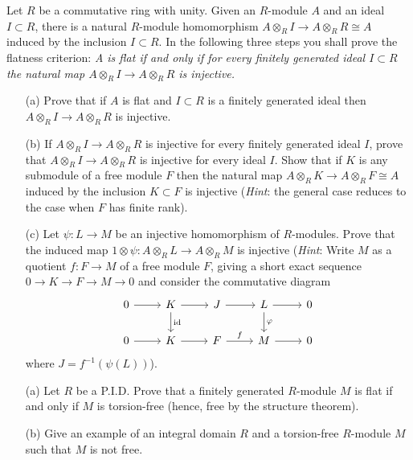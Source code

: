 \begin{prob}[F2013-Q3]
    Let \(R\) be a commutative ring with unity. Given an \(R\)-module \(A\) and an ideal \(I \subset R\), there is a natural \(R\)-module homomorphism \(A \otimes_R I \to A \otimes_R R \cong A\) induced by the inclusion \(I \subset R\). In the following three steps you shall prove the flatness criterion: \textit{A is flat if and only if for every finitely generated ideal \(I \subset R\) the natural map \(A \otimes_R I \to A \otimes_R R\) is injective.}
    \begin{itemize}
        \item[(a)] Prove that if \(A\) is flat and \(I \subset R\) is a finitely generated ideal then \(A \otimes_R I \to A \otimes_R R\) is injective.
        \item[(b)] If \(A \otimes_R I \to A \otimes_R R\) is injective for every finitely generated ideal \(I\), prove that \(A \otimes_R I \to A \otimes_R R\) is injective for every ideal \(I\). Show that if \(K\) is any submodule of a free module \(F\) then the natural map \(A \otimes_R K \to A \otimes_R F \cong A\) induced by the inclusion \(K \subset F\) is injective (\textit{Hint}: the general case reduces to the case when \(F\) has finite rank).
        \item[(c)] Let \(\psi : L \to M\) be an injective homomorphism of \(R\)-modules. Prove that the induced map \(1 \otimes \psi : A \otimes_R L \to A \otimes_R M\) is injective (\textit{Hint}: Write \(M\) as a quotient \(f : F \to M\) of a free module \(F\), giving a short exact sequence \(0 \to K \to F \to M \to 0\) and consider the commutative diagram
        \[\begin{tikzcd}
            0 & K & J & L & 0 \\
            0 & K & F & M & 0
            \arrow[from=1-1, to=1-2]
            \arrow[from=1-2, to=1-3]
            \arrow["{\text{id}}", from=1-2, to=2-2]
            \arrow[from=1-3, to=1-4]
            \arrow[from=1-4, to=1-5]
            \arrow["\varphi", from=1-4, to=2-4]
            \arrow[from=2-1, to=2-2]
            \arrow[from=2-2, to=2-3]
            \arrow["f", from=2-3, to=2-4]
            \arrow[from=2-4, to=2-5]
        \end{tikzcd}\]
        where \(J = f^{-1}(\psi(L))\)).
    \end{itemize}
\end{prob}



\begin{prob}[F2013-Q4]
    \phantom{text}
    \begin{itemize}
        \item[(a)] Let \(R\) be a P.I.D. Prove that a finitely generated \(R\)-module \(M\) is flat if and only if \(M\) is torsion-free (hence, free by the structure theorem).
        \item[(b)] Give an example of an integral domain \(R\) and a torsion-free \(R\)-module \(M\) such that \(M\) is not free.
    \end{itemize}
\end{prob}

